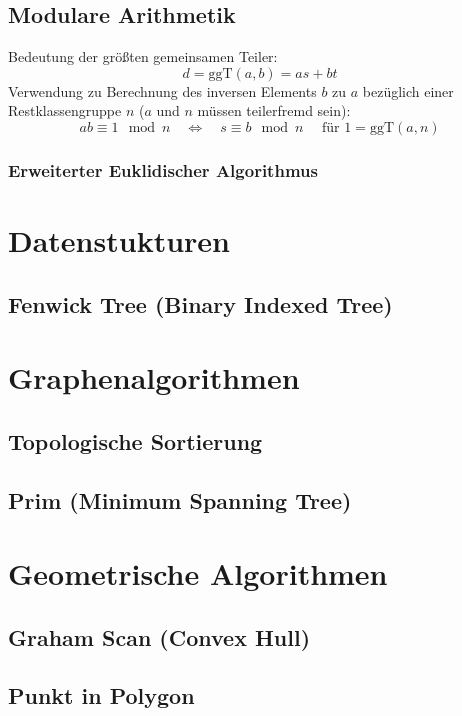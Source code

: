 \documentclass[10pt,a4paper,ngerman,oneside,twocolumn]{article}
\begin{document}
\subsection{Modulare Arithmetik}
Bedeutung der größten gemeinsamen Teiler:
\[ d = \text{ggT}(a,b) = as+bt \]
Verwendung zu Berechnung des inversen Elements $b$ zu $a$ bezüglich einer Restklassengruppe $n$ ($a$ und $n$ müssen teilerfremd sein):
\[ ab\equiv 1 \mod n\quad\Leftrightarrow\quad s\equiv b \mod n\quad\text{ für }1=\text{ggT}(a,n)\]
\subsubsection{Erweiterter Euklidischer Algorithmus}


\section{Datenstukturen}
\subsection{Fenwick Tree (Binary Indexed Tree)}


\section{Graphenalgorithmen}
\subsection{Topologische Sortierung}

\subsection{Prim (Minimum Spanning Tree)}


\section{Geometrische Algorithmen}
\subsection{Graham Scan (Convex Hull)}

\subsection{Punkt in Polygon}

\end{document}
